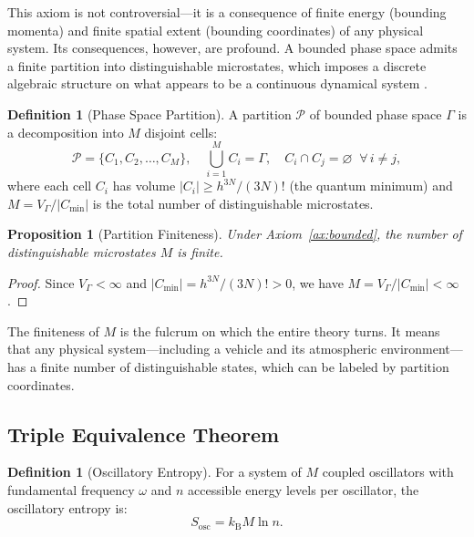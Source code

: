 \documentclass[12pt]{article}
\newtheorem{proposition}[theorem]{Proposition}
\theoremstyle{definition}
\newtheorem{definition}[theorem]{Definition}
\theoremstyle{remark}
\newcommand{\Sosc}{S_{\mathrm{osc}}}
\newcommand{\kB}{k_{\mathrm{B}}}
\newcommand{\VGamma}{V_{\Gamma}}
\begin{document}
This axiom is not controversial---it is a consequence of finite energy (bounding momenta) and finite spatial extent (bounding coordinates) of any physical system. Its consequences, however, are profound. A bounded phase space admits a finite partition into distinguishable microstates, which imposes a discrete algebraic structure on what appears to be a continuous dynamical system \cite{sachikonye2026partition, sachikonye2026poincare}.

\begin{definition}[Phase Space Partition]
\label{def:partition}
A partition $\mathcal{P}$ of bounded phase space $\Gamma$ is a decomposition into $M$ disjoint cells:
\begin{equation}
  \mathcal{P} = \{C_1, C_2, \ldots, C_M\}, \quad \bigcup_{i=1}^{M} C_i = \Gamma, \quad C_i \cap C_j = \varnothing \;\; \forall\, i \neq j,
  \label{eq:partition_def}
\end{equation}
where each cell $C_i$ has volume $|C_i| \geq h^{3N}/(3N)!$ (the quantum minimum) and $M = \VGamma / |C_{\min}|$ is the total number of distinguishable microstates.
\end{definition}

\begin{proposition}[Partition Finiteness]
\label{prop:finite_partition}
Under Axiom~\ref{ax:bounded}, the number of distinguishable microstates $M$ is finite.
\end{proposition}

\begin{proof}
Since $\VGamma < \infty$ and $|C_{\min}| = h^{3N}/(3N)! > 0$, we have $M = \VGamma / |C_{\min}| < \infty$.
\end{proof}

The finiteness of $M$ is the fulcrum on which the entire theory turns. It means that any physical system---including a vehicle and its atmospheric environment---has a finite number of distinguishable states, which can be labeled by partition coordinates.

\subsection{Triple Equivalence Theorem}

\begin{definition}[Oscillatory Entropy]
\label{def:osc_entropy}
For a system of $M$ coupled oscillators with fundamental frequency $\omega$ and $n$ accessible energy levels per oscillator, the oscillatory entropy is:
\begin{equation}
  \Sosc = \kB M \ln n.
  \label{eq:sosc}
\end{equation}
\end{definition}
\end{document}
